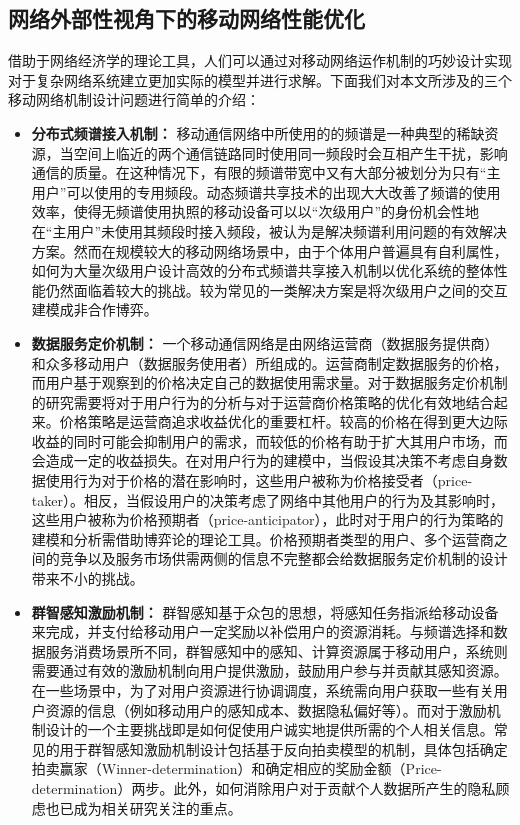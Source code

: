 \subsection{网络外部性视角下的移动网络性能优化}
借助于网络经济学的理论工具，人们可以通过对移动网络运作机制的巧妙设计实现对于复杂网络系统建立更加实际的模型并进行求解。下面我们对本文所涉及的三个移动网络机制设计问题进行简单的介绍：
\begin{itemize}
\item \textbf{分布式频谱接入机制：} 移动通信网络中所使用的的频谱是一种典型的稀缺资源，当空间上临近的两个通信链路同时使用同一频段时会互相产生干扰，影响通信的质量。在这种情况下，有限的频谱带宽中又有大部分被划分为只有“主用户”可以使用的专用频段。动态频谱共享技术的出现大大改善了频谱的使用效率，使得无频谱使用执照的移动设备可以以“次级用户”的身份机会性地在“主用户”未使用其频段时接入频段，被认为是解决频谱利用问题的有效解决方案。然而在规模较大的移动网络场景中，由于个体用户普遍具有自利属性，如何为大量次级用户设计高效的分布式频谱共享接入机制以优化系统的整体性能仍然面临着较大的挑战。较为常见的一类解决方案是将次级用户之间的交互建模成非合作博弈\cite{wang2010game, chen2012spatial}。


\item \textbf{数据服务定价机制：} 一个移动通信网络是由网络运营商（数据服务提供商）和众多移动用户（数据服务使用者）所组成的。运营商制定数据服务的价格，而用户基于观察到的价格决定自己的数据使用需求量。对于数据服务定价机制的研究需要将对于用户行为的分析与对于运营商价格策略的优化有效地结合起来。价格策略是运营商追求收益优化的重要杠杆。较高的价格在得到更大边际收益的同时可能会抑制用户的需求，而较低的价格有助于扩大其用户市场，而会造成一定的收益损失。在对用户行为的建模中，当假设其决策不考虑自身数据使用行为对于价格的潜在影响时，这些用户被称为价格接受者（price-taker）。相反，当假设用户的决策考虑了网络中其他用户的行为及其影响时，这些用户被称为价格预期者（price-anticipator），此时对于用户的行为策略的建模和分析需借助博弈论的理论工具。价格预期者类型的用户、多个运营商之间的竞争以及服务市场供需两侧的信息不完整都会给数据服务定价机制的设计带来不小的挑战。

\item \textbf{群智感知激励机制：} 群智感知基于众包的思想，将感知任务指派给移动设备来完成，并支付给移动用户一定奖励以补偿用户的资源消耗。与频谱选择和数据服务消费场景所不同，群智感知中的感知、计算资源属于移动用户，系统则需要通过有效的激励机制向用户提供激励，鼓励用户参与并贡献其感知资源。在一些场景中，为了对用户资源进行协调调度，系统需向用户获取一些有关用户资源的信息（例如移动用户的感知成本、数据隐私偏好等）。而对于激励机制设计的一个主要挑战即是如何促使用户诚实地提供所需的个人相关信息。常见的用于群智感知激励机制设计包括基于反向拍卖模型的机制\cite{yang2012crowdsourcing}，具体包括确定拍卖赢家（Winner-determination）和确定相应的奖励金额（Price-determination）两步。此外，如何消除用户对于贡献个人数据所产生的隐私顾虑也已成为相关研究关注的重点。
\end{itemize}

